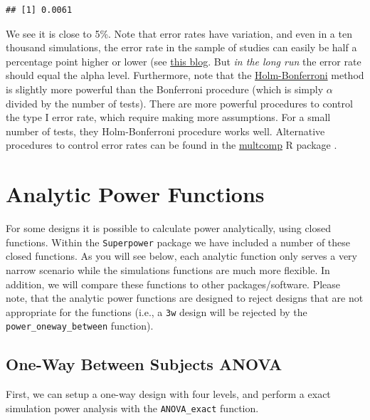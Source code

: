 \documentclass[
]{book}
\begin{document}
\begin{verbatim}
## [1] 0.0061
\end{verbatim}

We see it is close to 5\%.
Note that error rates have variation, and even in a ten thousand simulations, the error rate in the sample of studies can easily be half a percentage point higher or lower (see \href{https://daniellakens.blogspot.com/2020/01/observed-alpha-levels-why-statistical.html}{this blog}.
But \emph{in the long run} the error rate should equal the alpha level. Furthermore, note that the \href{https://en.wikipedia.org/wiki/Holm\%E2\%80\%93Bonferroni_method}{Holm-Bonferroni} method is slightly more powerful than the Bonferroni procedure (which is simply \(\alpha\) divided by the number of tests).
There are more powerful procedures to control the type I error rate, which require making more assumptions.
For a small number of tests, they Holm-Bonferroni procedure works well.
Alternative procedures to control error rates can be found in the \href{https://cran.r-project.org/web/packages/multcomp/index.html}{multcomp} R package \citep{R-multcomp}.

\hypertarget{analytic-power-functions}{%
\chapter{Analytic Power Functions}\label{analytic-power-functions}}

For some designs it is possible to calculate power analytically, using closed functions. Within the \texttt{Superpower} package we have included a number of these closed functions. As you will see below, each analytic function only serves a very narrow scenario while the simulations functions are much more flexible. In addition, we will compare these functions to other packages/software. Please note, that the analytic power functions are designed to reject designs that are not appropriate for the functions (i.e., a \texttt{3w} design will be rejected by the \texttt{power\_oneway\_between} function).

\hypertarget{one-way-between-subjects-anova}{%
\section{One-Way Between Subjects ANOVA}\label{one-way-between-subjects-anova}}

First, we can setup a one-way design with four levels, and perform a exact simulation power analysis with the \texttt{ANOVA\_exact} function.
\end{document}
